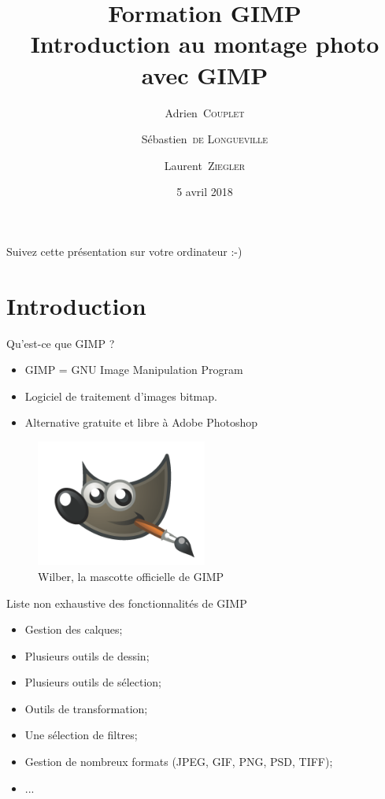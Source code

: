\documentclass[10pt,svgnames,usenames,table]{beamer}
\institute{Louvain-li-Nux}
\title{\textbf{Formation GIMP}\\
Introduction au montage photo avec GIMP}
\author{Adrien~\textsc{Couplet} \and Sébastien~\textsc{de Longueville} \and Laurent~\textsc{Ziegler}}
\date{5 avril 2018}
\begin{document}
\begin{frame}
	\maketitle
\end{frame}

\begin{frame}
  \begin{center}\Large
  Suivez cette présentation sur votre ordinateur :-)
  
  \vspace{1cm}
  \end{center}
\end{frame}

\section{Introduction}
\begin{frame}[allowframebreaks]{Qu'est-ce que GIMP ?}
    \begin{itemize}
        \item GIMP = GNU Image Manipulation Program
        \item Logiciel de traitement d'images bitmap.
        \item Alternative gratuite et libre à Adobe Photoshop
    \end{itemize}
    \begin{figure}
        \centering
        \includegraphics[width=0.5\textwidth]{Images/gimp-logo.png}
        \caption{Wilber, la mascotte officielle de GIMP} 
    \end{figure}
    \framebreak
    Liste non exhaustive des fonctionnalités de GIMP
    \begin{itemize}
        \item Gestion des calques;
        \item Plusieurs outils de dessin;
        \item Plusieurs outils de sélection;
        \item Outils de transformation;
        \item Une sélection de filtres;
        \item Gestion de nombreux formats (JPEG, GIF, PNG, PSD, TIFF);
        \item ...
    \end{itemize}
\end{frame}
\end{document}
